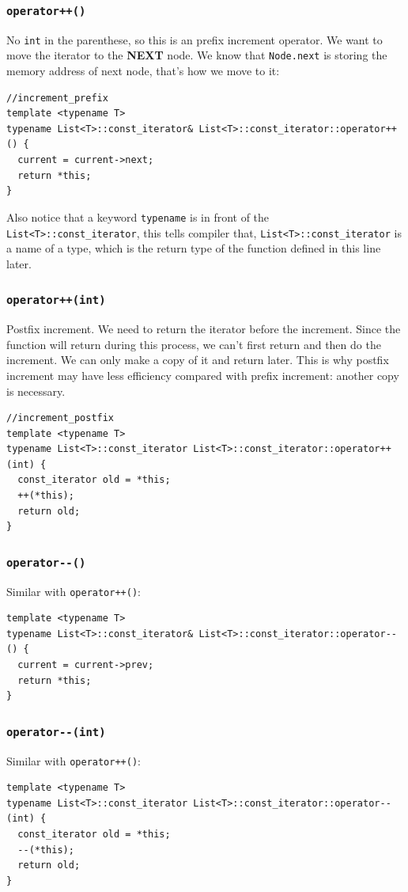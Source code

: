 \documentclass[11pt]{book}
\begin{document}
\subsubsection{\texttt{operator++()}}
\label{sec:orga6459ff}
No \texttt{int} in the parenthese, so this is an prefix increment operator. We want to move the iterator to the \textbf{NEXT} node. We know that \texttt{Node.next} is storing the memory address of next node, that's how we move to it:
\begin{verbatim}
//increment_prefix
template <typename T>
typename List<T>::const_iterator& List<T>::const_iterator::operator++() {
  current = current->next;
  return *this;
}
\end{verbatim}
Also notice that a keyword \texttt{typename} is in front of the \texttt{List<T>::const\_iterator}, this tells compiler that, \texttt{List<T>::const\_iterator} is a name of a type, which is the return type of the function defined in this line later.
\subsubsection{\texttt{operator++(int)}}
\label{sec:org770f331}
Postfix increment. We need to return the iterator before the increment. Since the function will return during this process, we can't first return and then do the increment. We can only make a copy of it and return later. This is why postfix increment may have less efficiency compared with prefix increment: another copy is necessary.
\begin{verbatim}
//increment_postfix
template <typename T>
typename List<T>::const_iterator List<T>::const_iterator::operator++(int) {
  const_iterator old = *this;
  ++(*this);
  return old;
}
\end{verbatim}
\subsubsection{\texttt{operator-{}-()}}
\label{sec:orgec611a2}
Similar with \texttt{operator++()}:
\begin{verbatim}
template <typename T>
typename List<T>::const_iterator& List<T>::const_iterator::operator--() {
  current = current->prev;
  return *this;
}
\end{verbatim}
\subsubsection{\texttt{operator-{}-(int)}}
\label{sec:org83e80b2}
Similar with \texttt{operator++()}:
\begin{verbatim}
template <typename T>
typename List<T>::const_iterator List<T>::const_iterator::operator--(int) {
  const_iterator old = *this;
  --(*this);
  return old;
}
\end{verbatim}
\end{document}
